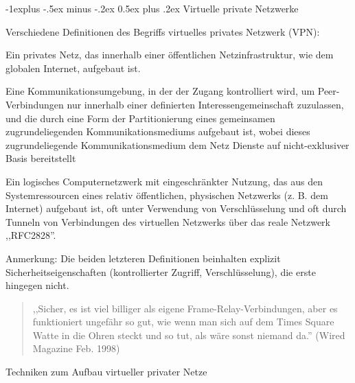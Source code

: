 \documentclass[a4paper]{article}
\makeatletter
\renewcommand{\subsection}{\@startsection{subsection}{2}{0mm}%
 {-1explus -.5ex minus -.2ex}%
 {0.5ex plus .2ex}%
 {\normalfont\normalsize\bfseries}}
\makeatother
\begin{document}
\begin{multicols}{3}
      \subsection{Virtuelle private
            Netzwerke}

      \begin{itemize*}
            \item Verschiedene Definitionen des Begriffs virtuelles privates Netzwerk
            (VPN):
            \begin{itemize*}
                  \item Ein privates Netz, das innerhalb einer öffentlichen Netzinfrastruktur, wie dem globalen Internet, aufgebaut ist.
                  \item Eine Kommunikationsumgebung, in der der Zugang kontrolliert wird, um Peer-Verbindungen nur innerhalb einer definierten Interessengemeinschaft zuzulassen, und die durch eine Form der Partitionierung eines gemeinsamen zugrundeliegenden Kommunikationsmediums aufgebaut ist, wobei dieses zugrundeliegende Kommunikationsmedium dem Netz Dienste auf nicht-exklusiver Basis bereitstellt
                  \item Ein logisches Computernetzwerk mit eingeschränkter Nutzung, das aus den Systemressourcen eines relativ öffentlichen, physischen Netzwerks (z. B. dem Internet) aufgebaut ist, oft unter Verwendung von Verschlüsselung und oft durch Tunneln von Verbindungen des virtuellen Netzwerks über das reale Netzwerk ,,RFC2828''.
                  \item Anmerkung: Die beiden letzteren Definitionen beinhalten explizit Sicherheitseigenschaften (kontrollierter Zugriff, Verschlüsselung), die erste hingegen nicht.
            \end{itemize*}
      \end{itemize*}

      \begin{quote}
            ,,Sicher, es ist viel billiger als eigene Frame-Relay-Verbindungen, aber
            es funktioniert ungefähr so gut, wie wenn man sich auf dem Times Square
            Watte in die Ohren steckt und so tut, als wäre sonst niemand da.''
            (Wired Magazine Feb. 1998)
      \end{quote}

      Techniken zum Aufbau virtueller privater Netze


\end{multicols}
\end{document}
